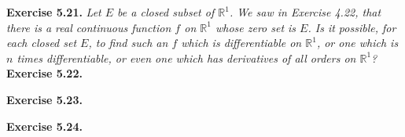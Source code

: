 \documentclass{article}
\begin{document}



\textbf{Exercise 5.21.}
\emph{Let $E$ be a closed subset of $\mathbb{R}^1$.
We saw in Exercise 4.22, that there is a real continuous function $f$ on $\mathbb{R}^1$
whose zero set is $E$.
Is it possible, for each closed set $E$,
to find such an $f$ which is differentiable on $\mathbb{R}^1$,
or one which is $n$ times differentiable,
or even one which has derivatives of all orders on $\mathbb{R}^1$?} \\






\textbf{Exercise 5.22.}






\textbf{Exercise 5.23.}






\textbf{Exercise 5.24.}



\end{document}
